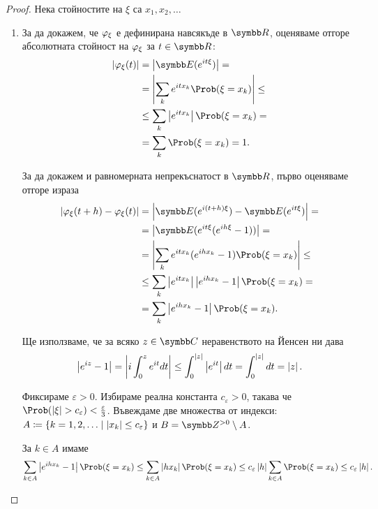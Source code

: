 \documentclass[numbers=endperiod, bibliography=totocnumbered]{scrartcl}
\begin{document}
\begin{proof}
  Нека стойностите на \( \xi \) са \( x_1, x_2, \ldots \)

  \begin{enumerate}
    \item За да докажем, че \( \varphi_\xi \) е дефинирана навсякъде в \( \R \), оценяваме отгоре абсолютната стойност на \( \varphi_\xi \) за \( t \in \R \):
    \begin{align*}
      \Abs{\Char_\xi(t)}
      &=
      \Abs{\Expect(e^{it\xi})}
      = \\ &=
      \Abs{\sum_k e^{it x_k} \Prob(\xi = x_k)}
      \leq \\ &\leq
      \sum_k \Abs{e^{it x_k}} \Prob(\xi = x_k)
      = \\ &=
      \sum_k \Prob(\xi = x_k)
      =
      1.
    \end{align*}

    За да докажем и равномерната непрекъснатост в \( \R \), първо оценяваме отгоре израза
    \begin{align*}
      \Abs{\Char_\xi(t + h) - \Char_\xi(t)}
      &=
      \Abs{\Expect(e^{i(t + h)\xi}) - \Expect(e^{it\xi})}
      = \\ &=
      \Abs{\Expect(e^{it\xi} (e^{ih\xi} - 1))}
      = \\ &=
      \Abs{\sum_k e^{it x_k} (e^{ih x_k} - 1) \Prob(\xi = x_k)}
      \leq \\ &\leq
      \sum_k \Abs{e^{it x_k}} \Abs{e^{ih x_k} - 1} \Prob(\xi = x_k)
      = \\ &=
      \sum_k \Abs{e^{ih x_k} - 1} \Prob(\xi = x_k).
    \end{align*}

    Ще използваме, че за всяко \( z \in \Complex \) неравенството на Йенсен ни дава
    \begin{equation*}
      \left\vert e^{iz} - 1 \right\vert
      =
      \left\vert i \int_0^z e^{it} dt \right\vert
      \leq
      \int_0^{\left\vert z \right\vert} \left\vert e^{it} \right\vert dt
      =
      \int_0^{\left\vert z \right\vert} dt
      =
      \left\vert z \right\vert.
    \end{equation*}

    Фиксираме \( \varepsilon > 0 \). Избираме реална константа \( c_\varepsilon > 0 \), такава че \( \Prob(\Abs{\xi} > c_\varepsilon) < \frac \varepsilon 3 \).
    Въвеждаме две множества от индекси: \( A \coloneqq \{ k = 1, 2, \ldots \mid \left\vert x_k \right\vert \leq c_\varepsilon \} \) и \( B = \Z^{>0} \setminus A \).

    За \( k \in A \) имаме
    \begin{equation*}
      \sum_{k \in A} \Abs{e^{ih x_k} - 1} \Prob(\xi = x_k)
      \leq
      \sum_{k \in A} \Abs{h x_k} \Prob(\xi = x_k)
      \leq
      c_\varepsilon \Abs h \sum_{k \in A} \Prob(\xi = x_k)
      \leq
      c_\varepsilon \Abs h.
    \end{equation*}


\end{enumerate}
\end{proof}
\end{document}
